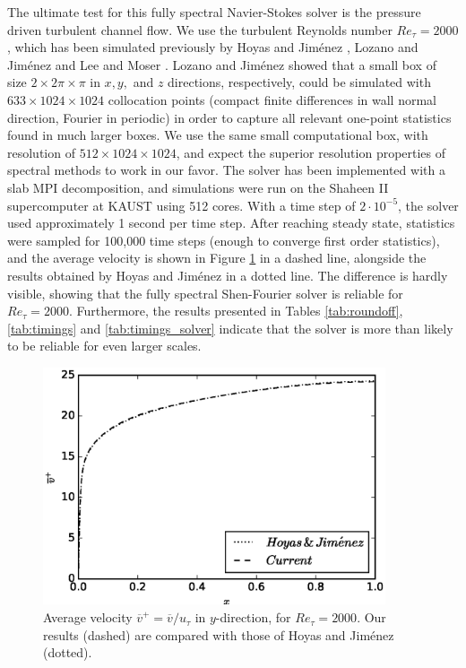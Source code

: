 \documentclass[11pt, oneside]{elsarticle}
\newcommand{\D}[1]{\overline{#1}}
\begin{document}
The ultimate test for this fully spectral Navier-Stokes solver is the pressure driven turbulent channel flow.  We use the turbulent Reynolds number $Re_{\tau}=2000$, which has been simulated previously by Hoyas and Jim\'{e}nez \cite{hoyas06}, Lozano and Jim\'{e}nez \cite{Lozano2014} and Lee and Moser \cite{leemoser15}. Lozano and Jim\'{e}nez showed that a small box  of size $2 \times 2\pi \times \pi$ in $x, y,$ and $z$ directions, respectively, could be simulated with $633 \times 1024 \times 1024$ collocation points (compact finite differences in wall normal direction, Fourier in periodic) in order to capture all relevant one-point statistics found in much larger boxes. We use the same small computational box, with resolution of $512 \times 1024 \times 1024$, and expect the superior resolution properties of spectral methods to work in our favor. The solver has been implemented with a slab MPI decomposition, and simulations were run on the Shaheen II supercomputer at KAUST using 512 cores. With a time step of $2\cdot10^{-5}$, the solver used approximately 1 second per time step. After reaching steady state, statistics were sampled for 100,000 time steps (enough to converge first order statistics), and the average velocity is shown in Figure \ref{fig:U_mean} in a dashed line, alongside the results obtained by Hoyas and Jim\'{e}nez \cite{hoyas06} in a dotted line. The difference is hardly visible, showing that the fully spectral Shen-Fourier solver is reliable for $Re_{\tau} = 2000$. Furthermore, the results presented in Tables \ref{tab:roundoff}, \ref{tab:timings} and \ref{tab:timings_solver} indicate that the solver is more than likely to be reliable for even larger scales.

\begin{figure}[t]
	\begin{center}
	\includegraphics[width=0.9\textwidth]{U_Re2000.eps}
	\caption{Average velocity $\D{v}^+ = \D{v}/u_{\tau}$ in $y$-direction, for $Re_{\tau}=2000$. Our results (dashed) are compared with those of Hoyas and Jim\'{e}nez \cite{hoyas06} (dotted).}
	\label{fig:U_mean}
	\end{center}
\end{figure}
\end{document}

